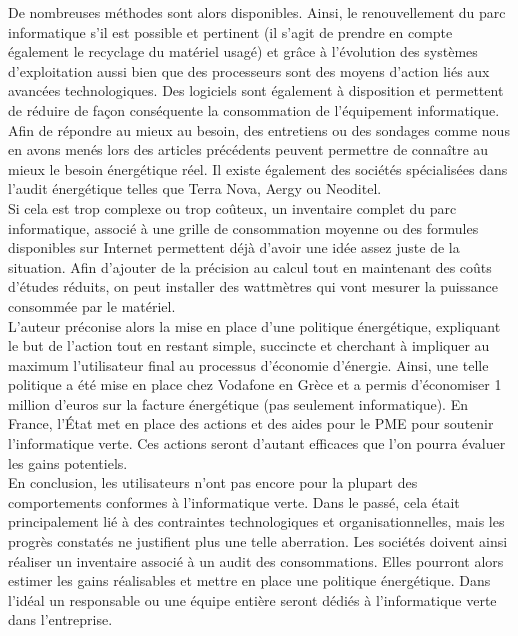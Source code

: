 \documentclass[a4paper,11pt,french]{article}
\begin{document}
De nombreuses méthodes sont alors disponibles. Ainsi, le renouvellement du parc informatique s’il est possible et pertinent (il s’agit de prendre en compte également le recyclage du matériel usagé) et grâce à l’évolution des systèmes d’exploitation aussi bien que des processeurs sont des moyens d’action liés aux avancées technologiques. Des logiciels sont également à disposition et permettent de réduire de façon conséquente la consommation de l’équipement informatique.\\

Afin de répondre au mieux au besoin, des entretiens ou des sondages comme nous en avons menés lors des articles précédents peuvent permettre de connaître au mieux le besoin énergétique réel. Il existe également des sociétés spécialisées dans l’audit énergétique telles que Terra Nova, Aergy ou Neoditel.\\

Si cela est trop complexe ou trop coûteux, un inventaire complet du parc informatique, associé à une grille de consommation moyenne ou des formules disponibles sur Internet permettent déjà d’avoir une idée assez juste de la situation. Afin d’ajouter de la précision au calcul tout en maintenant des coûts d’études réduits, on peut installer des wattmètres qui vont mesurer la puissance consommée par le matériel.\\

L’auteur préconise alors la mise en place d’une politique énergétique, expliquant le but de l’action tout en restant simple, succincte et cherchant à impliquer au maximum l’utilisateur final au processus d’économie d’énergie. Ainsi, une telle politique a été mise en place chez Vodafone en Grèce et a permis d’économiser 1 million d’euros sur la facture énergétique (pas seulement informatique). En France, l’État met en place des actions et des aides pour le PME pour soutenir l’informatique verte. Ces actions seront d’autant efficaces que l’on pourra évaluer les gains potentiels.\\

En conclusion, les utilisateurs n’ont pas encore pour la plupart des comportements conformes à l’informatique verte. Dans le passé, cela était principalement lié à des contraintes technologiques et organisationnelles, mais les progrès constatés ne justifient plus une telle aberration. Les sociétés doivent ainsi réaliser un inventaire associé à un audit des consommations. Elles pourront alors estimer les gains réalisables et mettre en place une politique énergétique. Dans l’idéal un responsable ou une équipe entière seront dédiés à l’informatique verte dans l’entreprise.\\
\end{document}
